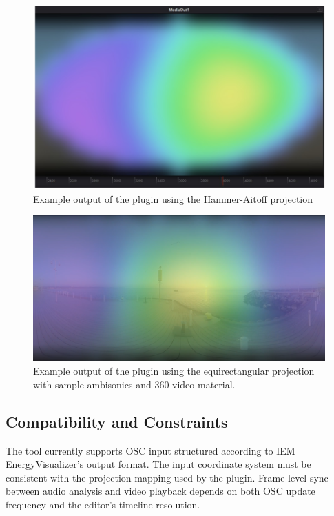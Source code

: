 \documentclass[convention,student-expo]{aesconf} %
\begin{document}
\begin{figure}[t]
\begin{center}
\includegraphics[width=0.95\columnwidth]{hammer-aitoff.png}
\caption{Example output of the plugin using the Hammer-Aitoff projection}
\label{fg:hammer_plot}
\end{center}
\end{figure}

\begin{figure}[t]
\begin{center}
\includegraphics[width=0.95\columnwidth]{boat.png}
\caption{Example output of the plugin using the equirectangular projection with sample ambisonics and 360 video material.}
\label{fg:equirect_plot}
\end{center}
\end{figure}

\subsection{Compatibility and Constraints}

The tool currently supports OSC input structured according to IEM EnergyVisualizer's output format. The input coordinate system must be consistent with the projection mapping used by the plugin. Frame-level sync between audio analysis and video playback depends on both OSC update frequency and the editor’s timeline resolution.
\end{document}
